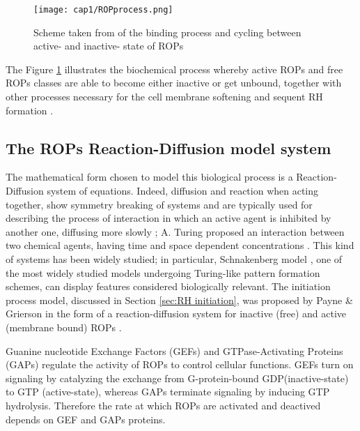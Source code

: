 \begin{figure}
  \centering
  \texttt{[image: cap1/ROPprocess.png]}
  \caption{Scheme taken from \cite{phdthesis:victor} of the binding process and cycling between active- and inactive- state of ROPs}
  \label{fig:process}
\end{figure}

The Figure \ref{fig:process} illustrates the biochemical process whereby active ROPs and free ROPs classes are able to become either inactive or get unbound, together with other processes necessary for the cell membrane softening and sequent RH formation \cite{phd:97_airop}.

\subsection{The ROPs Reaction-Diffusion model system} \label{sec:intromodel}

The mathematical form chosen to model this biological process is a Reaction-Diffusion system of equations. Indeed, diffusion and reaction when acting together, show symmetry breaking of systems and are typically used for describing the process of interaction in which an active agent is inhibited by another one, diffusing more slowly \cite{phd:97_airop}; A. Turing proposed an interaction between two chemical agents, having time and space dependent concentrations \cite{phd:131_turing}. This kind of systems has been widely studied; in particular, Schnakenberg model \cite{vic:Schnak}, one of the most widely studied models undergoing Turing-like pattern formation schemes, can display features considered biologically relevant. The initiation process  model, discussed in Section \ref{sec:RH initiation}, was proposed by Payne \& Grierson \cite{payne} in the form of a reaction-diffusion system for inactive (free) and active (membrane bound) ROPs \cite{intra2:15_Schnak}.

Guanine nucleotide Exchange Factors (GEFs) and GTPase-Activating Proteins (GAPs) regulate the activity of ROPs to control cellular functions. GEFs turn on signaling by catalyzing the exchange from G-protein-bound GDP(inactive-state) to GTP (active-state), whereas GAPs terminate signaling by inducing GTP hydrolysis. Therefore the rate at which ROPs are activated and deactived depends on GEF and GAPs proteins.

